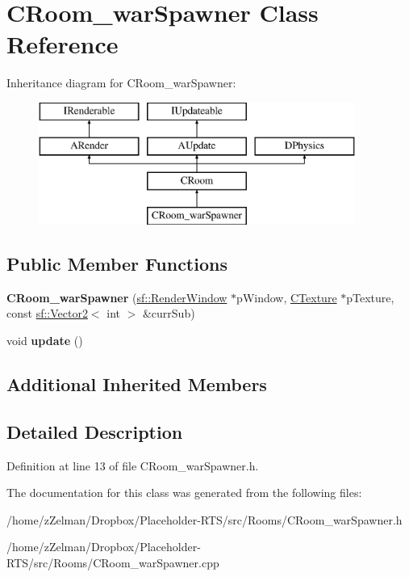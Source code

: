 \hypertarget{classCRoom__warSpawner}{\section{C\-Room\-\_\-war\-Spawner Class Reference}
\label{classCRoom__warSpawner}
}
Inheritance diagram for C\-Room\-\_\-war\-Spawner\-:\begin{figure}[H]
\begin{center}
\leavevmode
\includegraphics[height=4.000000cm]{classCRoom__warSpawner}
\end{center}
\end{figure}
\subsection*{Public Member Functions}
\begin{DoxyCompactItemize}
\item 
\hypertarget{classCRoom__warSpawner_a279e5119a796495be8dc294826b7b7cf}{{\bfseries C\-Room\-\_\-war\-Spawner} (\hyperlink{classsf_1_1RenderWindow}{sf\-::\-Render\-Window} $\ast$p\-Window, \hyperlink{classCTexture}{C\-Texture} $\ast$p\-Texture, const \hyperlink{classsf_1_1Vector2}{sf\-::\-Vector2}$<$ int $>$ \&curr\-Sub)}\label{classCRoom__warSpawner_a279e5119a796495be8dc294826b7b7cf}

\item 
\hypertarget{classCRoom__warSpawner_a67388a7401fddf2655945364dc42f837}{void {\bfseries update} ()}\label{classCRoom__warSpawner_a67388a7401fddf2655945364dc42f837}

\end{DoxyCompactItemize}
\subsection*{Additional Inherited Members}


\subsection{Detailed Description}


Definition at line 13 of file C\-Room\-\_\-war\-Spawner.\-h.



The documentation for this class was generated from the following files\-:\begin{DoxyCompactItemize}
\item 
/home/z\-Zelman/\-Dropbox/\-Placeholder-\/\-R\-T\-S/src/\-Rooms/C\-Room\-\_\-war\-Spawner.\-h\item 
/home/z\-Zelman/\-Dropbox/\-Placeholder-\/\-R\-T\-S/src/\-Rooms/C\-Room\-\_\-war\-Spawner.\-cpp\end{DoxyCompactItemize}
